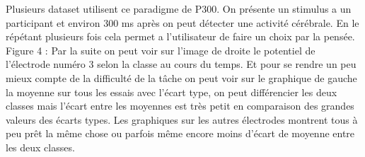 \documentclass{article}[12pt]
\begin{document}
Plusieurs dataset utilisent ce paradigme de P300. On présente un stimulus a un participant et environ 300 ms après on peut détecter une activité cérébrale. En le répétant plusieurs fois cela permet a l'utilisateur de faire un choix par la pensée.\\


Figure 4 : Par la suite on peut voir sur l'image de droite le potentiel de l’électrode numéro 3 selon la classe au cours du temps. Et pour se rendre un peu mieux compte de la difficulté de la tâche on peut voir sur le graphique de gauche la moyenne sur tous les essais avec l’écart type, on peut différencier les deux classes mais l’écart entre les moyennes est très petit en comparaison des grandes valeurs des écarts types. Les graphiques sur les autres électrodes montrent tous à peu prêt la même chose ou parfois même encore moins d’écart de moyenne entre les deux classes.
\end{document}
